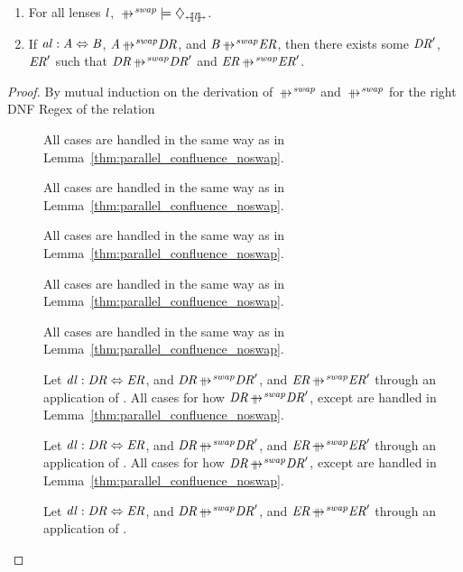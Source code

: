 \documentclass[numbers]{sigplanconf}
\begin{document}
\begin{theorem}
  \label{thm:parallel_confluence_swap}
  \begin{enumerate}\leavevmode
  \item For all lenses $\mathit{l}$,
    $\IsConfluentWithPropertyOf{\ParallelRewriteSwap}{\DNFLensHasSemanticsOf{\Lens}}$.
  \item If $\mathit{al} : \mathit{A} \Leftrightarrow \mathit{B}$, $\Atom
    \ParallelRewriteSwapAtom \DNFRegex$, and $\AtomAlt \ParallelRewriteSwapAtom \DNFRegexAlt$, then
    there exists some $\mathit{DR}'$, $\mathit{ER}'$ such that $\DNFRegex
    \ParallelRewriteSwap \DNFRegex'$ and $\DNFRegexAlt \ParallelRewriteSwap \DNFRegexAlt'$.
  \end{enumerate}
\end{theorem}
\begin{proof}
  By mutual induction on the derivation of $\ParallelRewriteSwap$ and $\ParallelRewriteSwapAtom$ for
  the right DNF Regex of the relation
  \begin{description}
  \item[\LeftUnrollRewriteRule{}]
    All cases are handled in the same way as in
    Lemma~\ref{thm:parallel_confluence_noswap}.
  \item[\RightUnrollRewriteRule{}]
    All cases are handled in the same way as in
    Lemma~\ref{thm:parallel_confluence_noswap}.
  \item[]
    All cases are handled in the same way as in
    Lemma~\ref{thm:parallel_confluence_noswap}.
  \item[]
    All cases are handled in the same way as in
    Lemma~\ref{thm:parallel_confluence_noswap}.
  \item[\StarIntroRewriteRule{}]
    All cases are handled in the same way as in
    Lemma~\ref{thm:parallel_confluence_noswap}.
  \item[\DNFIntroRewriteRule{}]
    Let $\mathit{dl} : \mathit{DR} \Leftrightarrow \mathit{ER}$, and
    $\DNFRegex\ParallelRewriteSwap\DNFRegex'$, and $\DNFRegexAlt\ParallelRewriteSwap\DNFRegexAlt'$
    through an application of \DNFIntroRewriteRule{}.
    All cases for how $\DNFRegex \ParallelRewriteSwap \DNFRegex'$,
    except \DNFReorderRule{} are handled in
    Lemma~\ref{thm:parallel_confluence_noswap}.
  \item[\IdentityRewriteRule{}]
    Let $\mathit{dl} : \mathit{DR} \Leftrightarrow \mathit{ER}$, and
    $\DNFRegex\ParallelRewriteSwap\DNFRegex'$, and $\DNFRegexAlt\ParallelRewriteSwap\DNFRegexAlt'$
    through an application of \IdentityRewriteRule{}.
    All cases for how $\DNFRegex \ParallelRewriteSwap \DNFRegex'$,
    except \DNFReorderRule{} are handled in
    Lemma~\ref{thm:parallel_confluence_noswap}.
  \item[\DNFReorderRule{}]
    Let $\mathit{dl} : \mathit{DR} \Leftrightarrow \mathit{ER}$, and
    $\DNFRegex\ParallelRewriteSwap\DNFRegex'$, and $\DNFRegexAlt\ParallelRewriteSwap\DNFRegexAlt'$
    through an application of \DNFReorderRule{}.
  \end{description}
\end{proof}
\end{document}
